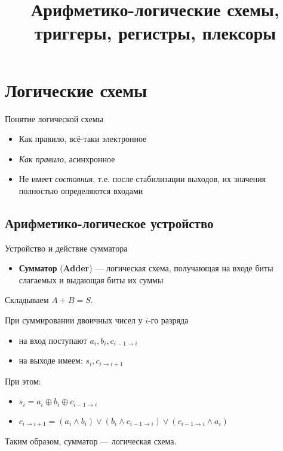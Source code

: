 \documentclass[xetex,aspectratio=43]{beamer}
\title[Триггеры и логика]{Арифметико-логические схемы, триггеры, регистры, плексоры}
\begin{document}
    \titleslide

    \tocslide

\section{Логические схемы}

\begin{frame}{Понятие логической схемы}
    \pause
    \begin{itemize}
        \item Как правило, всё-таки электронное
        \item \emph{Как правило}, асинхронное
        \item Не имеет \emph{состояния}, т.е. после стабилизации выходов, их значения полностью определяются входами
    \end{itemize}
\end{frame}

\subsection{Арифметико-логическое устройство}

\begin{frame}{Устройство и действие сумматора}
    \begin{itemize}
        \tightlist
        \item
        \textbf{Сумматор} (\textbf{Adder}) --- логическая схема, получающая на
        входе биты слагаемых и выдающая биты их суммы
    \end{itemize}

    Складываем \(A+B=S\).

    При суммировании двоичных чисел у \(i\)-го разряда

    \begin{itemize}
        \tightlist
        \item
        на вход поступают \(a_i, b_i, c_{i-1 \rightarrow i}\)
        \item
        на выходе имеем: \(s_i, c_{i \rightarrow i+1}\)
    \end{itemize}

    При этом:

    \begin{itemize}
        \tightlist
        \item
        \(s_i = a_i \oplus b_i \oplus c_{i-1 \rightarrow i}\)
        \item
        \(c_{i \rightarrow i+1} = (a_i \land b_i) \lor (b_i \land c_{i-1 \rightarrow i}) \lor (c_{i-1 \rightarrow i} \land a_i)\)
    \end{itemize}

    Таким образом, сумматор --- логическая схема.
\end{frame}
\end{document}
